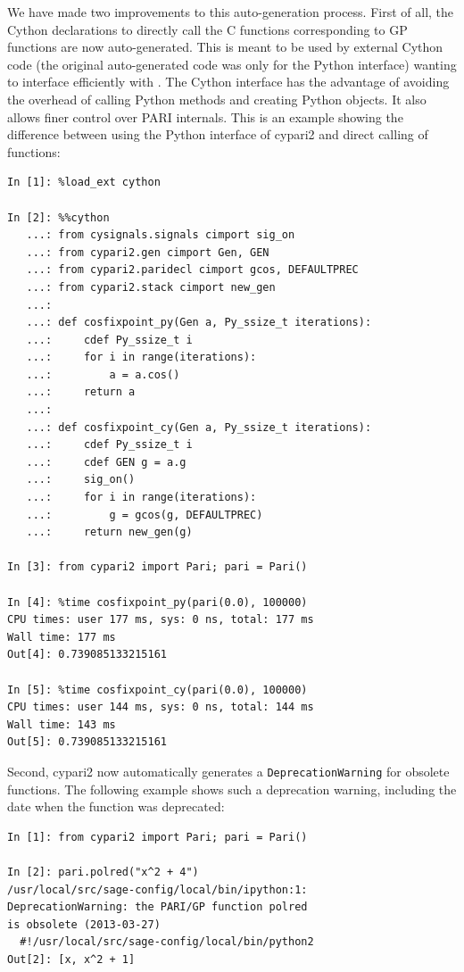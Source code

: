\documentclass{deliverablereport}
\begin{document}
We have made two improvements to this auto-generation process.
First of all,
the Cython declarations to directly call the C functions
corresponding to GP functions are now auto-generated.
This is meant to be used by external Cython code
(the original auto-generated code was only for the Python interface)
wanting to interface efficiently with \Pari.
The Cython interface has the advantage of avoiding the
overhead of calling Python methods and creating Python objects.
It also allows finer control over PARI internals.
This is an example showing the difference between using
the Python interface of cypari2 and direct calling of \Pari
functions:
\begin{verbatim}
In [1]: %load_ext cython

In [2]: %%cython
   ...: from cysignals.signals cimport sig_on
   ...: from cypari2.gen cimport Gen, GEN
   ...: from cypari2.paridecl cimport gcos, DEFAULTPREC
   ...: from cypari2.stack cimport new_gen
   ...:
   ...: def cosfixpoint_py(Gen a, Py_ssize_t iterations):
   ...:     cdef Py_ssize_t i
   ...:     for i in range(iterations):
   ...:         a = a.cos()
   ...:     return a
   ...:
   ...: def cosfixpoint_cy(Gen a, Py_ssize_t iterations):
   ...:     cdef Py_ssize_t i
   ...:     cdef GEN g = a.g
   ...:     sig_on()
   ...:     for i in range(iterations):
   ...:         g = gcos(g, DEFAULTPREC)
   ...:     return new_gen(g)

In [3]: from cypari2 import Pari; pari = Pari()

In [4]: %time cosfixpoint_py(pari(0.0), 100000)
CPU times: user 177 ms, sys: 0 ns, total: 177 ms
Wall time: 177 ms
Out[4]: 0.739085133215161

In [5]: %time cosfixpoint_cy(pari(0.0), 100000)
CPU times: user 144 ms, sys: 0 ns, total: 144 ms
Wall time: 143 ms
Out[5]: 0.739085133215161
\end{verbatim}

Second, cypari2 now automatically
generates a \texttt{DeprecationWarning}
for obsolete \PariGP functions.
The following example shows such a deprecation warning,
including the date when the function was deprecated:
\begin{verbatim}
In [1]: from cypari2 import Pari; pari = Pari()

In [2]: pari.polred("x^2 + 4")
/usr/local/src/sage-config/local/bin/ipython:1:
DeprecationWarning: the PARI/GP function polred
is obsolete (2013-03-27)
  #!/usr/local/src/sage-config/local/bin/python2
Out[2]: [x, x^2 + 1]
\end{verbatim}
\end{document}
